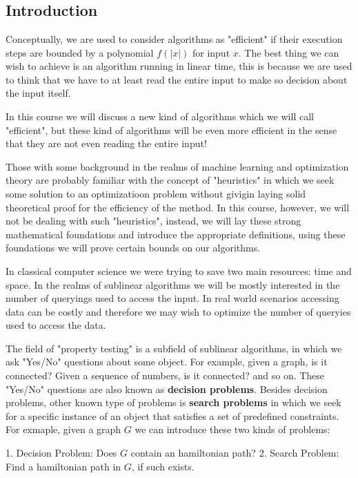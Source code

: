\chapter{}\label{lec:1}
\section{Introduction}
Conceptually, we are used to consider algorithms as "efficient" if their execution steps are bounded by a polynomial $f(|x|)$ for input $x$.
The best thing we can wish to achieve is an algorithm running in linear time, this is because we are used to think that we have to at least read the entire input to make so decision about the input itself.

In this course we will discuss a new kind of algorithms which we will call "efficient", but these kind of algorithms will be even more efficient in the sense that they are not even reading the entire input!

Those with some background in the realms of machine learning and optimization theory are probably familiar with the concept of "heuristics" in which we seek some solution to an optimizatioon problem without givigin laying solid theoretical proof for the efficiency of the method.
In this course, however, we will not be dealing with such "heuristics", instead, we will lay these strong mathematical foundations and introduce the appropriate definitions, using these foundations we will prove certain bounds on our algorithms.

In classical computer science we were trying to save two main resources: time and space. In the realms of sublinear algorithms we will be mostly interested in the number of queryings used to access the input. In real world scenarios accessing data can be costly and therefore we may wish to optimize the number of queryies used to access the data.

The field of "property testing" is a subfield of sublinear algorithms,  in which we ask "Yes/No" questions about some object.
For example, given a graph, is it connected? Given a sequence of numbers, is it connected? and so on. 
These "Yes/No"  questions are also known as \textbf{decision problems}.
Besides decision problems, other known type of problems is \textbf{search problems} in which we seek for a specific instance of an object that satisfies a set of predefined constraints. 
For exmaple, given a graph $G$ we can introduce these two kinds of problems:

1. Decision Problem: Does $G$ contain an hamiltonian path?
2. Search Problem: Find a hamiltonian path in $G$, if such exists.

